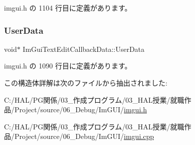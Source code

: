  imgui.\+h の 1104 行目に定義があります。

\mbox{\label{struct_im_gui_text_edit_callback_data_aaf4994a17aefa6ace9cf8f7c2fa06cf7}} 
\subsubsection{\texorpdfstring{User\+Data}{UserData}}
{\footnotesize\ttfamily void$\ast$ Im\+Gui\+Text\+Edit\+Callback\+Data\+::\+User\+Data}



 imgui.\+h の 1090 行目に定義があります。



この構造体詳解は次のファイルから抽出されました\+:\begin{DoxyCompactItemize}
\item 
C\+:/\+H\+A\+L/\+P\+G関係/03\+\_\+作成プログラム/03\+\_\+\+H\+A\+L授業/就職作品/\+Project/source/06\+\_\+\+Debug/\+Im\+G\+U\+I/\mbox{\hyperlink{imgui_8h}{imgui.\+h}}\item 
C\+:/\+H\+A\+L/\+P\+G関係/03\+\_\+作成プログラム/03\+\_\+\+H\+A\+L授業/就職作品/\+Project/source/06\+\_\+\+Debug/\+Im\+G\+U\+I/\mbox{\hyperlink{imgui_8cpp}{imgui.\+cpp}}\end{DoxyCompactItemize}
